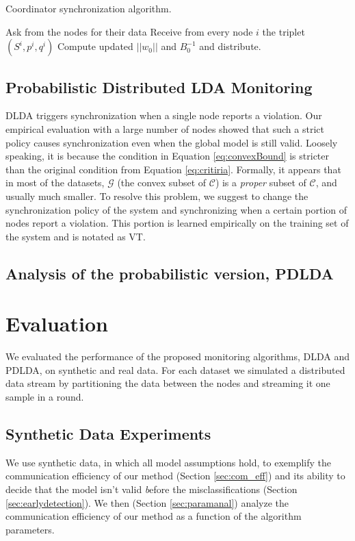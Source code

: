 \begin{algorithm}
\caption{Coordinator synchronization algorithm.}\label{DLDA}
\begin{algorithmic}[1]
\State Ask from the nodes for their data
\State Receive from every node $i$ the triplet $(S^i,p^i,q^i)$
\State Compute updated $||w_0||$ and $B_0^{-1}$ and distribute.
\EndIf
\EndProcedure
\end{algorithmic}
\end{algorithm}

\subsection{Probabilistic Distributed LDA Monitoring}\label{sec:PDLDA}

DLDA triggers synchronization when a single node reports a violation.
Our empirical evaluation with a large number of nodes showed that such a strict
policy causes synchronization even when the global model is still valid. Loosely speaking, it is because the condition in Equation \ref{eq:convexBound} is stricter than the original condition from Equation \ref{eq:critiria}. Formally, it appears that in most of the datasets, $\mathcal{G}$ (the  convex subset of $\mathcal{C}$) is a \textit{proper} subset of $\mathcal{C}$, and usually much smaller. To resolve this problem, we suggest to change the synchronization policy of the system and synchronizing when a certain portion of nodes report a violation.
This portion is learned empirically on the training set of the system and is notated as VT.
%
%
\subsection{Analysis of the probabilistic version, PDLDA}
%

\section{Evaluation}
%
We evaluated the performance of the proposed monitoring algorithms, DLDA and PDLDA, on synthetic and real data. For each dataset we simulated a distributed data stream by partitioning the data between the nodes and streaming it one sample in a round. 

\subsection{Synthetic Data Experiments}
We use synthetic data, in which all model assumptions hold, to
exemplify the communication efficiency of our method (Section \ref{sec:com_eff})
and its ability to decide that the model isn't valid {\emph before} the
misclassifications (Section \ref{sec:earlydetection}). We then (Section \ref{sec:paramanal}) analyze the communication efficiency of our method as a function of the algorithm parameters.
%
%
